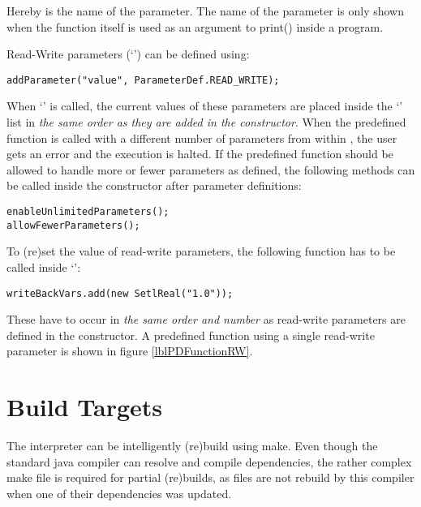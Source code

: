 Hereby  is the name of the parameter. The name of the parameter is only shown when the function itself is used as an argument to print() inside a \SetlX{} program.

Read-Write parameters (`') can be defined using:
\begin{lstlisting}[frame=none,numbers=none]
addParameter("value", ParameterDef.READ_WRITE);
\end{lstlisting}

When `' is called, the current values of these parameters are placed inside the `' list in \emph{the same order as they are added in the constructor}. When the predefined function is called with a different number of parameters from within \SetlX{}, the user gets an error and the execution is halted. If the predefined function should be allowed to handle more or fewer parameters as defined, the following methods can be called inside the constructor after parameter definitions:
\begin{lstlisting}[frame=none,numbers=none]
enableUnlimitedParameters();
allowFewerParameters();
\end{lstlisting}

To (re)set the value of read-write parameters, the following function has to be called inside `':
\begin{lstlisting}[frame=none,numbers=none]
writeBackVars.add(new SetlReal("1.0"));
\end{lstlisting}

These have to occur in \emph{the same order and number} as read-write parameters are defined in the constructor. A predefined function using a single read-write parameter is shown in figure \ref{lblPDFunctionRW}.


\section{Build Targets}

The interpreter can be intelligently (re)build using make.
Even though the standard java compiler can resolve and compile dependencies, the rather complex make file is required for partial (re)builds, as files are not rebuild by this compiler when one of their dependencies was updated.

